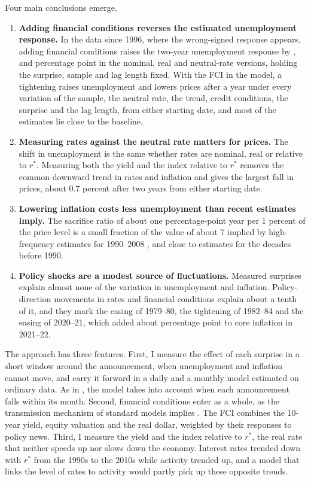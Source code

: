 \documentclass[11pt]{article}
\newcommand{\rs}{r^{*}}
\begin{document}
Four main conclusions emerge.
\begin{enumerate}\setlength\itemsep{0pt}
\item \textbf{Adding financial conditions reverses the estimated unemployment response.} In the data since 1996, where the wrong-signed response appears, adding financial conditions raises the two-year unemployment response by ,  and  percentage point in the nominal, real and neutral-rate versions, holding the surprise, sample and lag length fixed. With the FCI in the model, a tightening raises unemployment and lowers prices after a year under every variation of the sample, the neutral rate, the trend, credit conditions, the surprise and the lag length, from either starting date, and most of the estimates lie close to the baseline.
\item \textbf{Measuring rates against the neutral rate matters for prices.} The shift in unemployment is the same whether rates are nominal, real or relative to $\rs$. Measuring both the yield and the index relative to $\rs$ removes the common downward trend in rates and inflation and gives the largest fall in prices, about 0.7 percent after two years from either starting date.
\item \textbf{Lowering inflation costs less unemployment than recent estimates imply.} The sacrifice ratio of about one percentage-point year per 1 percent of the price level is a small fraction of the value of about 7 implied by high-frequency estimates for 1990--2008 \citep{barnichon2021}, and close to estimates for the decades before 1990.
\item \textbf{Policy shocks are a modest source of fluctuations.} Measured surprises explain almost none of the variation in unemployment and inflation. Policy-direction movements in rates and financial conditions explain about a tenth of it, and they mark the easing of 1979--80, the tightening of 1982--84 and the easing of 2020--21, which added about  percentage point to core inflation in 2021--22.
\end{enumerate}

The approach has three features. First, I measure the effect of each surprise in a short window around the announcement, when unemployment and inflation cannot move, and carry it forward in a daily and a monthly model estimated on ordinary data. As in \citet{jacobson2026}, the model takes into account when each announcement falls within its month. Second, financial conditions enter as a whole, as the transmission mechanism of standard models implies \citep{boivin2010}. The FCI combines the 10-year yield, equity valuation and the real dollar, weighted by their responses to policy news. Third, I measure the yield and the index relative to $\rs$, the real rate that neither speeds up nor slows down the economy. Interest rates trended down with $\rs$ from the 1990s to the 2010s \citep{laubach2003,holston2017,holston2023,hamilton2016,bauer2020,kiley2020} while activity trended up, and a model that links the level of rates to activity would partly pick up these opposite trends.
\end{document}
